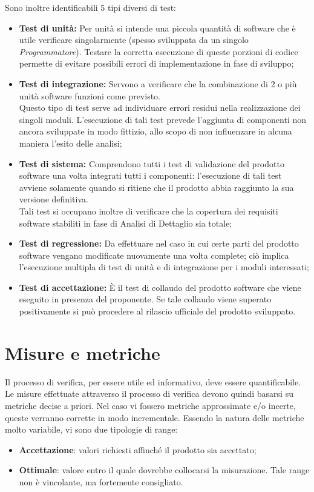 \begin{itemize}
Sono inoltre identificabili 5 tipi diversi di test:
\begin{itemize}
	\item \textbf{Test di unità:} Per unità si intende una piccola quantità di software che è utile verificare singolarmente (spesso sviluppata da un singolo \textit{Programmatore}).
	Testare la corretta esecuzione di queste porzioni di codice permette di evitare possibili errori di implementazione in fase di sviluppo; 
	\item \textbf{Test di integrazione:} Servono a verificare che la combinazione di 2 o più unità
	software funzioni come previsto. \\
	Questo tipo di test serve ad individuare errori residui nella realizzazione dei singoli
	moduli.
	L'esecuzione di tali test prevede l'aggiunta di componenti non ancora sviluppate in modo fittizio, allo scopo di non influenzare in alcuna maniera l'esito delle analisi;
	\item \textbf{Test di sistema:} Comprendono tutti i test di validazione del prodotto software una volta integrati tutti i componenti: l'esecuzione 
	di tali test avviene solamente quando si ritiene che il prodotto abbia raggiunto la sua versione definitiva.\\
	Tali test si occupano inoltre di verificare che la copertura dei requisiti software stabiliti in fase di Analisi
	di Dettaglio sia totale;
	\item \textbf{Test di regressione:} Da effettuare nel caso in cui certe parti del prodotto software vengano modificate nuovamente una volta complete; ciò implica l'esecuzione multipla di test di unità e di integrazione per i moduli interessati;
	\item \textbf{Test di accettazione:} È il test di collaudo del prodotto software che viene eseguito in presenza del proponente.
	Se tale collaudo viene superato positivamente si può procedere al rilascio ufficiale del
	prodotto sviluppato.
\end{itemize}
	
\end{itemize}	
\chapter{Misure e metriche}\label{Metriche}
Il processo di verifica, per essere utile ed informativo, deve essere quantificabile. Le misure effettuate attraverso il processo di verifica devono quindi basarsi su metriche decise a priori.
Nel caso vi fossero metriche approssimate e/o incerte, queste verranno corrette in modo incrementale.
Essendo la natura delle metriche molto variabile, vi sono due tipologie di range:
\begin{itemize}
	\item \textbf{Accettazione}: valori richiesti affinché  il prodotto sia accettato;
	\item \textbf{Ottimale}: valore entro il quale dovrebbe collocarsi la misurazione. Tale range non è vincolante, ma fortemente consigliato.
\end{itemize}
